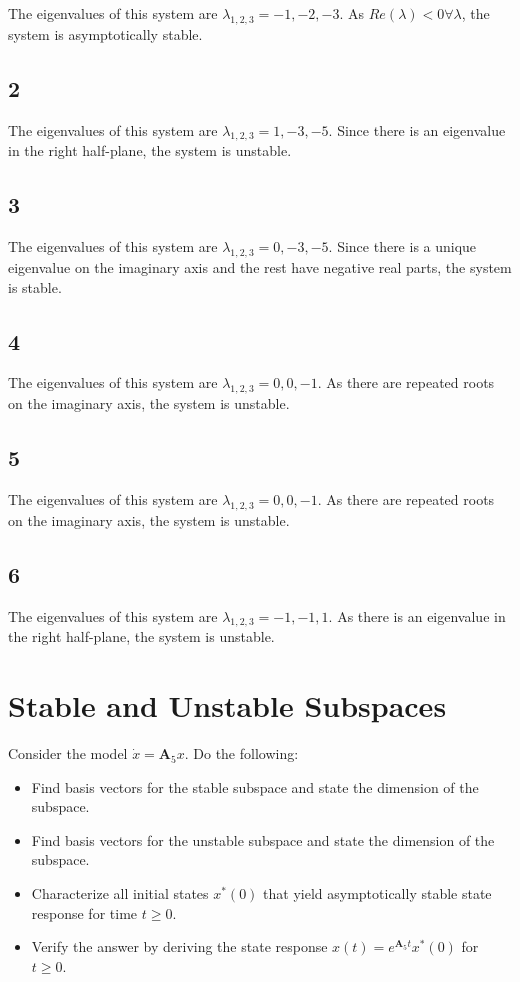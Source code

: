 \documentclass[]{article}
\begin{document}
The eigenvalues of this system are $\lambda_{1,2,3} = -1, -2, -3$.
As $Re(\lambda) < 0 \forall \lambda$, the system is asymptotically stable.

\subsection{2}
The eigenvalues of this system are $\lambda_{1,2,3} = 1, -3, -5$.
Since there is an eigenvalue in the right half-plane, the system is unstable.

\subsection{3}
The eigenvalues of this system are $\lambda_{1,2,3} = 0, -3, -5$.
Since there is a unique eigenvalue on the imaginary axis and the rest have negative real parts, the system is stable.

\subsection{4}
The eigenvalues of this system are $\lambda_{1,2,3} = 0,0,-1$.
As there are repeated roots on the imaginary axis, the system is unstable.

\subsection{5}
The eigenvalues of this system are $\lambda_{1,2,3} = 0,0,-1$.
As there are repeated roots on the imaginary axis, the system is unstable.

\subsection{6}
The eigenvalues of this system are $\lambda_{1,2,3} = -1, -1, 1$.
As there is an eigenvalue in the right half-plane, the system is unstable.

\section{Stable and Unstable Subspaces}

Consider the model $\dot{x} = \mathbf{A}_5x$.
Do the following:
\begin{itemize}
	\item Find basis vectors for the stable subspace and state the dimension of the subspace.
	\item Find basis vectors for the unstable subspace and state the dimension of the subspace.
	\item Characterize all initial states $x^*(0)$ that yield asymptotically stable state response for time $t \ge 0$.
	\item Verify the answer by deriving the state response $x(t) = e^{\mathbf{A}_5t}x^*(0)$ for $t \ge 0$.
\end{itemize}
\end{document}
